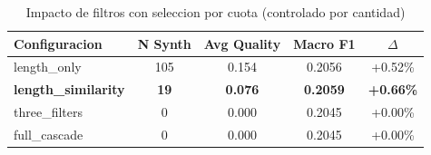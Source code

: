 
\begin{table}[h]
\centering
\caption{Impacto de filtros con seleccion por cuota (controlado por cantidad)}
\label{tab:filter_cascade_v2}
\begin{tabular}{lcccc}
\hline
Configuracion & N Synth & Avg Quality & Macro F1 & $\Delta$ \\
\hline
length_only & 105 & 0.154 & 0.2056 & +0.52\% \\
\textbf{length_similarity} & \textbf{19} & \textbf{0.076} & \textbf{0.2059} & \textbf{+0.66\%} \\
three_filters & 0 & 0.000 & 0.2045 & +0.00\% \\
full_cascade & 0 & 0.000 & 0.2045 & +0.00\% \\

\hline
\end{tabular}
\end{table}
